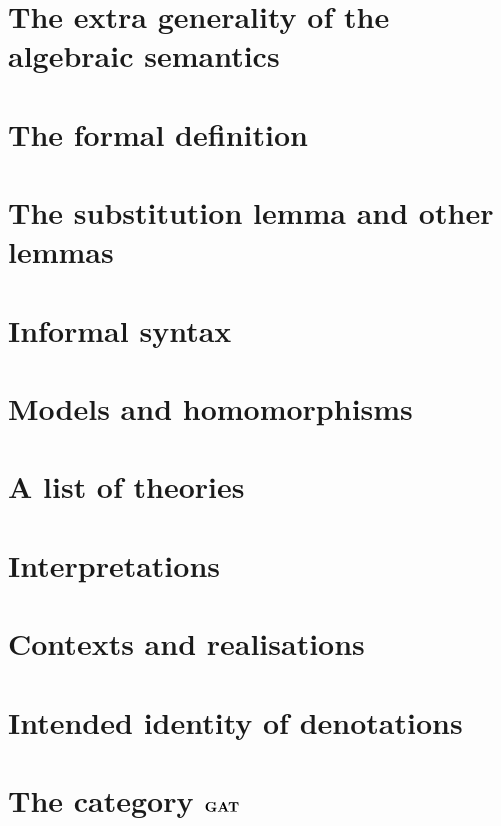 \lipsum[3]

\section{The extra generality of the algebraic semantics} \label{sec:source-1-5}

\lipsum[4]

\section{The formal definition} \label{sec:source-1-6}

\lipsum[5]

\section{The substitution lemma and other lemmas} \label{sec:source-1-7}

\lipsum[6]

\section{Informal syntax} \label{sec:source-1-8}

\lipsum[7]

\section{Models and homomorphisms} \label{sec:source-1-9}

\lipsum[8]

\section{A list of theories} \label{sec:source-1-10}

\lipsum[9]

\section{Interpretations} \label{sec:source-1-11}

\lipsum[10]

\section{Contexts and realisations} \label{sec:source-1-12}

\lipsum[11]

\section{Intended identity of denotations} \label{sec:source-1-13}

\lipsum[12]

\section{The category $\mathbf{GAT}$} \label{sec:source-1-14}

\lipsum[13]

